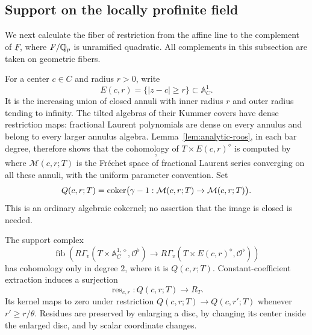 \subsection{Support on the locally profinite field}

We next calculate the fiber of restriction from the affine line to
the complement of \(\underline F\), where \(F/\mathbb Q_p\) is unramified
quadratic.  All complements in this subsection are taken on
geometric fibers.

For a center \(c\in C\) and radius \(r>0\), write
\[
 E(c,r)=\{|z-c|\geq r\}\subset\mathbb A^1_C.
\]
It is the increasing union of closed annuli with inner radius \(r\)
and outer radius tending to infinity.  The tilted algebras of their
Kummer covers have dense restriction maps: fractional Laurent
polynomials are dense on every annulus and belong to every larger
annulus algebra.  Lemma~\ref{lem:analytic-roos}, in each bar degree,
therefore shows that the cohomology of \(T\times E(c,r)^\diamond\)
is computed by
\begin{equation}
 [\,\mathcal M(c,r;T)\xrightarrow{\gamma-1}
                  \mathcal M(c,r;T)\,],
 \label{eq:analytic-exterior-complex}
\end{equation}
where \(\mathcal M(c,r;T)\) is the Fr\'echet space of fractional
Laurent series converging on all these annuli, with the uniform
parameter convention.  Set
\[
 Q(c,r;T)=
 \operatorname{coker}\bigl(\gamma-1:\mathcal M(c,r;T)\to\mathcal M(c,r;T)\bigr).
\]
This is an ordinary algebraic cokernel; no assertion that the image
is closed is needed.

\begin{samepage}
\begin{lemma}
\label{lem:single-hole-residue}
The support complex
\[
 \operatorname{fib}\left(
 R\Gamma_v(T\times\mathbb A^{1,\diamond}_C,\mathcal O^\flat)
 \longrightarrow
 R\Gamma_v(T\times E(c,r)^\diamond,\mathcal O^\flat)\right)
\]
has cohomology only in degree \(2\), where it is \(Q(c,r;T)\).
Constant-coefficient extraction induces a surjection
\begin{equation}
 \operatorname{res}_{c,r}:Q(c,r;T)\longrightarrow R_T.
 \label{eq:analytic-residue}
\end{equation}
Its kernel maps to zero under restriction
\(Q(c,r;T)\to Q(c,r';T)\) whenever \(r'\geq r/\theta\).
Residues are preserved by enlarging a disc, by changing its center
inside the enlarged disc, and by scalar coordinate changes.
\end{lemma}
\end{samepage}


